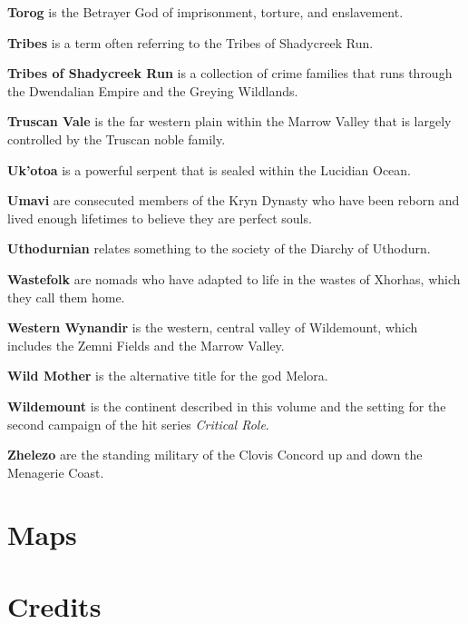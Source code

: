 \documentclass[10pt,a4paper,twoside,bg=print,twocolumn,openany,nodeprecatedcode]{dndbook}
\begin{document}
\textbf{Torog} is the Betrayer God of imprisonment, torture, and enslavement.

\textbf{Tribes} is a term often referring to the Tribes of Shadycreek Run.

\textbf{Tribes of Shadycreek Run} is a collection of crime families that runs through the Dwendalian Empire and the Greying Wildlands.

\textbf{Truscan Vale} is the far western plain within the Marrow Valley that is largely controlled by the Truscan noble family.

\textbf{Uk'otoa} is a powerful serpent that is sealed within the Lucidian Ocean.

\textbf{Umavi} are consecuted members of the Kryn Dynasty who have been reborn and lived enough lifetimes to believe they are perfect souls.

\textbf{Uthodurnian} relates something to the society of the Diarchy of Uthodurn.

\textbf{Wastefolk} are nomads who have adapted to life in the wastes of Xhorhas, which they call them home.

\textbf{Western Wynandir} is the western, central valley of Wildemount, which includes the Zemni Fields and the Marrow Valley.

\textbf{Wild Mother} is the alternative title for the god Melora.

\textbf{Wildemount} is the continent described in this volume and the setting for the second campaign of the hit series \textit{Critical Role}.

\textbf{Zhelezo} are the standing military of the Clovis Concord up and down the Menagerie Coast.

\chapter{Maps}
\chapter{Credits}
\end{document}
